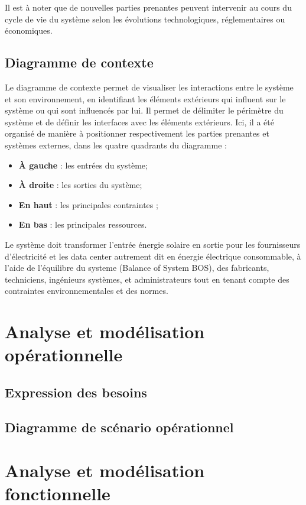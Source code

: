 \documentclass{article}
\begin{document}
Il est à noter que de nouvelles parties prenantes peuvent intervenir au cours du cycle de vie du système selon les évolutions technologiques, réglementaires ou économiques. 
\subsection{Diagramme de contexte} 

Le diagramme de contexte permet de visualiser les interactions entre le système et son environnement, en identifiant les éléments extérieurs qui influent sur le système ou qui sont influencés par lui. Il permet de délimiter le périmètre du système et de définir les interfaces avec les éléments extérieurs. Ici, il a été organisé de manière à positionner respectivement les parties prenantes et systèmes externes, dans les quatre quadrants du diagramme :
\begin{itemize}
    \item \textbf{À gauche} : les entrées du système;
    \item \textbf{À droite} : les sorties du système;
    \item \textbf{En haut} : les principales contraintes ;
    \item \textbf{En bas} : les principales ressources.
\end{itemize}
Le système doit transformer l'entrée énergie solaire en sortie pour les fournisseurs d'électricité et les data center autrement dit en énergie électrique consommable, à l'aide de l'équilibre du systeme (Balance of System BOS), des fabricants, techniciens, ingénieurs systèmes, et administrateurs tout en tenant compte des contraintes environnementales et des normes.  



\section{Analyse et modélisation opérationnelle}
\subsection{Expression des besoins}

\subsection{Diagramme de scénario opérationnel}


\section{Analyse et modélisation fonctionnelle}
\end{document}
